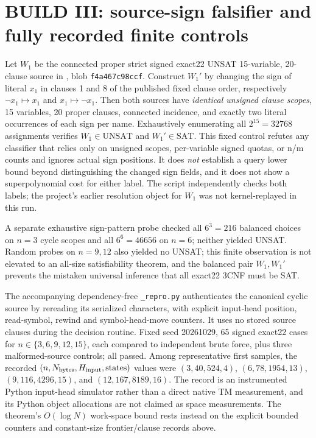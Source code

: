 \documentclass[11pt]{article}
\newcommand{\SAT}{\mathrm{SAT}}
\newcommand{\UNSAT}{\mathrm{UNSAT}}
\begin{document}
\section{BUILD III: source-sign falsifier and fully recorded finite controls}
Let $W_1$ be the connected proper strict signed exact22 UNSAT 15-variable, 20-clause source in , blob \texttt{f4a467c98ccf}. Construct $W_1'$ by changing the sign of literal $x_1$ in clauses 1 and 8 of the published fixed clause order, respectively $\neg x_1\mapsto x_1$ and $x_1\mapsto\neg x_1$. Then both sources have \emph{identical unsigned clause scopes}, 15 variables, 20 proper clauses, connected incidence, and exactly two literal occurrences of each sign per name. Exhaustively enumerating all $2^{15}=32768$ assignments verifies $W_1\in\UNSAT$ and $W_1'\in\SAT$. This fixed control refutes any classifier that relies only on unsigned scopes, per-variable signed quotas, or n/m counts and ignores actual sign positions. It does \emph{not} establish a query lower bound beyond distinguishing the changed sign fields, and it does not show a superpolynomial cost for either label. The script independently checks both labels; the project's earlier resolution object for $W_1$ was not kernel-replayed in this run.

A separate exhaustive sign-pattern probe checked all $6^3=216$ balanced choices on $n=3$ cycle scopes and all $6^6=46656$ on $n=6$; neither yielded UNSAT. Random probes on $n=9,12$ also yielded no UNSAT; this finite observation is not elevated to an all-size satisfiability theorem, and the balanced pair $W_1,W_1'$ prevents the mistaken universal inference that all exact22 3CNF must be SAT.

The accompanying dependency-free \texttt{\_repro.py} authenticates the canonical cyclic source by rereading its serialized characters, with explicit input-head position, read-symbol, rewind and symbol-head-move counters. It uses no stored source clauses during the decision routine. Fixed seed 20261029, 65 signed exact22 cases for $n\in\{3,6,9,12,15\}$, each compared to independent brute force, plus three malformed-source controls; all passed. Among representative first samples, the recorded $(n,N_{\rm bytes},H_{\rm input},\text{states})$ values were $(3,40,524,4)$, $(6,78,1954,13)$, $(9,116,4296,15)$, and $(12,167,8189,16)$. The record is an instrumented Python input-head simulator rather than a direct native TM measurement, and its Python object allocations are not claimed as space measurements. The theorem's $O(\log N)$ work-space bound rests instead on the explicit bounded counters and constant-size frontier/clause records above.
\end{document}
